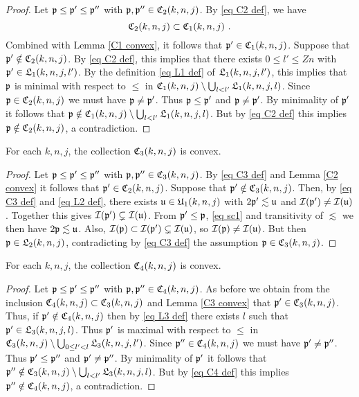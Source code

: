{\begin{proof}
     Let $\mathfrak p \le \mathfrak p' \le \mathfrak p''$ with $\mathfrak p, \mathfrak p'' \in \mathfrak C_2(k,n,j)$. By \eqref{eq C2 def}, we have
     \begin{equation*}
         \fC_2(k,n,j) \subset \fC_1(k,n,j)\ .
     \end{equation*} Combined with Lemma \ref{C1 convex}, it follows that $\mathfrak p' \in \mathfrak C_1(k,n,j)$. Suppose that $\mathfrak p' \notin \mathfrak C_2(k,n,j)$. By \eqref{eq C2 def}, this implies that there exists $0 \le l' \le Zn$ with $\mathfrak p' \in \mathfrak L_1(k,n,j,l')$. By the definition \eqref{eq L1 def} of $\mathfrak L_1(k,n,j,l')$, this implies that $\mathfrak p$ is minimal with respect to $\le$  in $\mathfrak C_1(k,n,j) \setminus \bigcup_{l < l'} \mathfrak L_1(k,n,j,l)$. Since $\mathfrak p \in \mathfrak C_2(k,n,j)$ we must have $\mathfrak p \ne \mathfrak p'$. Thus $\mathfrak p \le \mathfrak p'$ and $\mathfrak p \ne \mathfrak p'$. By minimality of $\mathfrak p'$ it follows that $\mathfrak p \notin \mathfrak C_1(k,n,j) \setminus \bigcup_{l < l'} \mathfrak L_1(k,n,j,l)$. But by \eqref{eq C2 def} this implies $\mathfrak p \notin \mathfrak C_2(k,n,j)$, a contradiction.
\end{proof}

\begin{lemma}
    \label{C3 convex}
    For each $k,n,j$, the collection $\mathfrak C_3(k,n,j)$ is convex.
\end{lemma}

\begin{proof}
    Let $\mathfrak p \le \mathfrak p' \le \mathfrak p''$ with $\mathfrak p, \mathfrak p'' \in \mathfrak C_3(k,n,j)$. By \eqref{eq C3 def} and Lemma \ref{C2 convex} it follows that $\mathfrak p' \in \mathfrak C_2(k,n,j)$. Suppose that $\mathfrak p' \notin \mathfrak C_3(k,n,j)$. Then, by \eqref{eq C3 def} and \eqref{eq L2 def}, there exists $\mathfrak u \in \mathfrak U_1(k,n,j)$ with $2\mathfrak p' \lesssim \mathfrak u$ and $\mathcal{I}(\mathfrak p') \ne \mathcal{I}(\mathfrak u)$. Together this gives $\mathcal{I}(\mathfrak p') \subsetneq \mathcal{I}(\mathfrak u)$. From $\mathfrak p' \le \mathfrak p$, \eqref{eq sc1} and transitivity of $\lesssim$ we then have $2\mathfrak p \lesssim \mathfrak u$. Also, $\mathcal{I}(\mathfrak p) \subset \mathcal{I}(\mathfrak p') \subsetneq \mathcal{I}(\mathfrak u)$, so $\mathcal{I}(\mathfrak p) \ne \mathcal{I}(\mathfrak u)$. But then $\mathfrak p \in \mathfrak L_2(k,n,j)$, contradicting by \eqref{eq C3 def} the assumption $\mathfrak p \in \mathfrak C_3(k,n,j)$.
\end{proof}

\begin{lemma}
    \label{C4 convex}
    For each $k,n,j$, the collection $\mathfrak C_4(k,n,j)$ is convex.
\end{lemma}

\begin{proof}
    Let $\mathfrak p \le \mathfrak p' \le\mathfrak p''$ with $\mathfrak p, \mathfrak p'' \in \mathfrak C_4(k,n,j)$. As before we obtain from the inclusion $\mathfrak C_4(k,n,j) \subset \mathfrak C_3(k,n,j)$ and Lemma \ref{C3 convex} that $\mathfrak p' \in \mathfrak C_3(k,n,j)$. Thus, if $\mathfrak p' \notin \mathfrak C_4(k,n,j)$ then by \eqref{eq L3 def} there exists $l$ such that $\mathfrak p' \in \mathfrak L_3(k,n,j,l)$. Thus $\mathfrak p'$ is maximal with respect to $\le$ in $\mathfrak C_3(k,n,j) \setminus \bigcup_{0 \le l' < l} \mathfrak L_3(k,n,j,l')$.  Since $\mathfrak p'' \in \mathfrak C_4(k,n,j)$ we must have $\mathfrak p' \ne \mathfrak p''$. Thus $\mathfrak p' \le \mathfrak p''$ and $\mathfrak p'\ne \mathfrak p''$. By minimality of $\mathfrak p'$ it follows that $\mathfrak p'' \notin \mathfrak C_3(k,n,j) \setminus \bigcup_{l < l'} \mathfrak L_3(k,n,j,l)$. But by \eqref{eq C4 def} this implies $\mathfrak p'' \notin \mathfrak C_4(k,n,j)$, a contradiction.
\end{proof}

}
